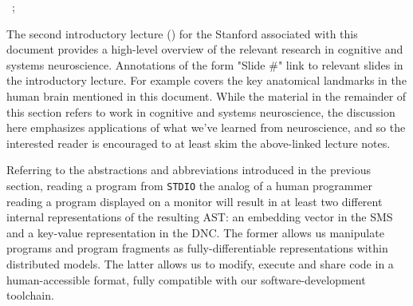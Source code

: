 \begin{itemize}
{\begin{center}
  \end{center}}~\cite{DevlinetalICLR-18,WangetalCoRR-17};
% 
\end{itemize}

The second introductory lecture ({}) for the Stanford {} associated with this document provides a high-level overview of the relevant research in cognitive and systems neuroscience. Annotations of the form "Slide \#" link to relevant slides in the introductory lecture. For example {{}} covers the key anatomical landmarks in the human brain mentioned in this document. While the material in the remainder of this section refers to work in cognitive and systems neuroscience, the discussion here emphasizes applications of what we've learned from neuroscience, and so the interested reader is encouraged to at least skim the above-linked lecture notes.


Referring to the abstractions and abbreviations introduced in the previous section, reading a program from {\tt{STDIO}} \emdash{} the analog of a human programmer reading a program displayed on a monitor \emdash{} will result in \emdash{} at least \emdash{} two different internal representations of the resulting AST: an embedding vector in the SMS and a key-value representation in the DNC. The former allows us manipulate programs and program fragments as fully-differentiable representations within distributed models. The latter allows us to modify, execute and share code in a human-accessible format, fully compatible with our software-development toolchain.

